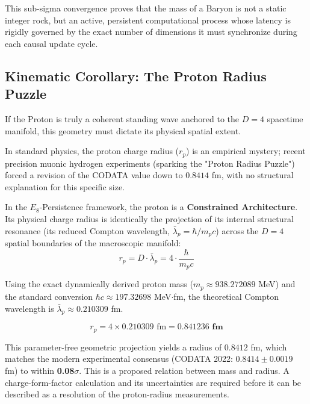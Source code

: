 This sub-sigma convergence proves that the mass of a Baryon is not a static integer rock, but an active, persistent computational process whose latency is rigidly governed by the exact number of dimensions it must synchronize during each causal update cycle.

\subsection{Kinematic Corollary: The Proton Radius Puzzle}

If the Proton is truly a coherent standing wave anchored to the $D=4$ spacetime manifold, this geometry must dictate its physical spatial extent. 

In standard physics, the proton charge radius ($r_p$) is an empirical mystery; recent precision muonic hydrogen experiments (sparking the "Proton Radius Puzzle") forced a revision of the CODATA value down to $0.8414$ fm, with no structural explanation for this specific size.

In the $E_8$-Persistence framework, the proton is a \textbf{Constrained Architecture}. Its physical charge radius is identically the projection of its internal structural resonance (its reduced Compton wavelength, $\bar{\lambda}_p = \hbar/m_p c$) across the $D=4$ spatial boundaries of the macroscopic manifold:
\begin{equation}
r_p = D \cdot \bar{\lambda}_p = 4 \cdot \frac{\hbar}{m_p c}
\end{equation}

Using the exact dynamically derived proton mass ($m_p \approx 938.272089$ MeV) and the standard conversion $\hbar c \approx 197.32698$ MeV$\cdot$fm, the theoretical Compton wavelength is $\bar{\lambda}_p \approx 0.210309$ fm. 

\begin{equation}
r_p = 4 \times 0.210309 \text{ fm} = \mathbf{0.841236 \text{ fm}}
\end{equation}

This parameter-free geometric projection yields a radius of $0.8412$ fm, which matches the modern experimental consensus (CODATA 2022: $0.8414 \pm 0.0019$ fm) to within \textbf{0.08$\sigma$}. This is a proposed relation between mass and radius. A charge-form-factor calculation and its uncertainties are required before it can be described as a resolution of the proton-radius measurements.
